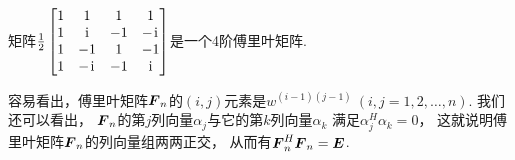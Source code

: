 \begin{example}
矩阵\(
	\frac12
	\begin{bmatrix}
		1 & 1 & 1 & 1 \\
		1 & \kern1pt\mathrm{i}\kern1pt & -1 & -\kern1pt\mathrm{i}\kern1pt \\
		1 & -1 & 1 & -1 \\
		1 & -\kern1pt\mathrm{i}\kern1pt & -1 & \kern1pt\mathrm{i}\kern1pt
	\end{bmatrix}
\)是一个4阶傅里叶矩阵.
\end{example}

容易看出，傅里叶矩阵\(\boldsymbol{F}_n\)的\((i,j)\)元素是\(
	w^{(i-1)(j-1)}
	\ (i,j=1,2,\dotsc,n)
\).
我们还可以看出，
\(\boldsymbol{F}_n\)的第\(j\)列向量\(\alpha_j\)与它的第\(k\)列向量\(\alpha_k\)
满足\(\alpha_j^H \alpha_k = 0\)，
这就说明傅里叶矩阵\(\boldsymbol{F}_n\)的列向量组两两正交，
从而有\(\boldsymbol{F}_n^H \boldsymbol{F}_n = \boldsymbol{E}\).
